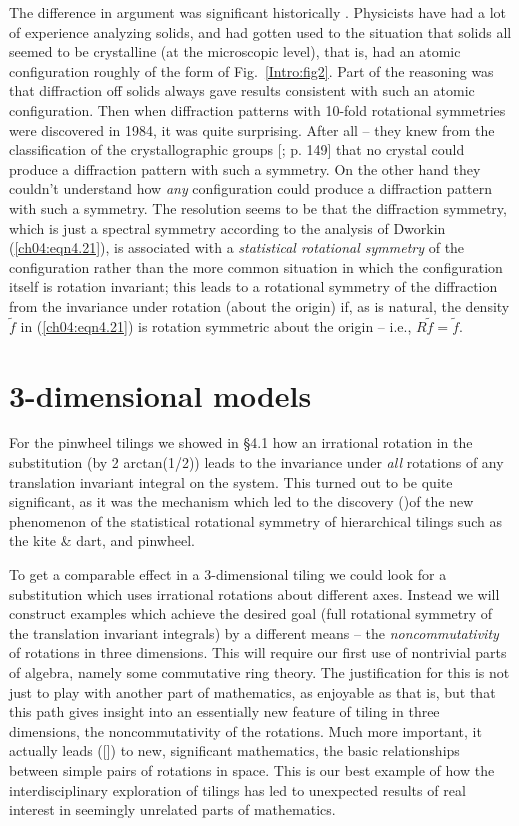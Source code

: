 \documentclass[reqno]{stml-l}
\theoremstyle{plain}
\theoremstyle{definition}
\numberwithin{equation}{chapter}
\begin{document}
The difference in argument was significant historically \cite{bib:StO,bib:Sen}. Physicists have had a lot of experience analyzing solids, and had gotten used to the situation that solids all seemed to be crystalline (at the microscopic level), that is, had an atomic configuration roughly of the form of Fig.~\ref{Intro:fig2}. Part of the reasoning was that diffraction off solids always gave results consistent with such an atomic configuration. Then when diffraction patterns with 10-fold rotational symmetries were discovered in 1984, it was quite surprising. After all -- they knew from the classification of the crystallographic groups [; p. 149] that no crystal could produce a diffraction pattern with such a symmetry. On the other hand they couldn't understand how \emph{any} configuration could produce a diffraction pattern with such a symmetry. The resolution seems to be that the diffraction symmetry, which is just a spectral symmetry according to the analysis of Dworkin (\ref{ch04:eqn4.21}), is associated with a \emph{statistical rotational symmetry} of the configuration rather than the more common situation in which the configuration itself is rotation invariant; this leads to a rotational symmetry of the diffraction from the invariance under rotation (about the origin) if, as is natural,
the density $\tilde{f}$ in (\ref{ch04:eqn4.21}) is rotation symmetric about the origin
-- i.e., $R\tilde{f} = \tilde{f}$.

\section{3-dimensional models}\label{ch04:sec3}

For the pinwheel tilings we showed in \S 4.1 how an irrational rotation in the substitution (by 2 arctan(1/2)) leads to the invariance under \emph{all} rotations of any translation invariant integral on the system. This turned out to be quite significant, as it was the mechanism which led to the discovery (\cite{bib:Ra4})of the new phenomenon of the statistical rotational symmetry of hierarchical tilings such as the kite \& dart, and pinwheel.

To get a comparable effect in a 3-dimensional tiling we could look for a substitution which uses irrational rotations about different axes. Instead we will construct examples which achieve the desired goal (full rotational symmetry of the translation invariant integrals) by a different means --
the \emph{noncommutativity} of rotations in three dimensions. This will require our first use of nontrivial parts of algebra, namely some commutative ring theory. The justification for this is not just to play with another part of mathematics, as enjoyable as that is, but that this path gives insight into an essentially new feature of tiling in three dimensions, the noncommutativity of the rotations. Much more important, it actually leads ([]) to new, significant mathematics, the basic relationships between simple pairs of rotations in space. This is our best example of how the interdisciplinary exploration of tilings has led to unexpected results of real interest in seemingly unrelated parts of mathematics.
\end{document}
